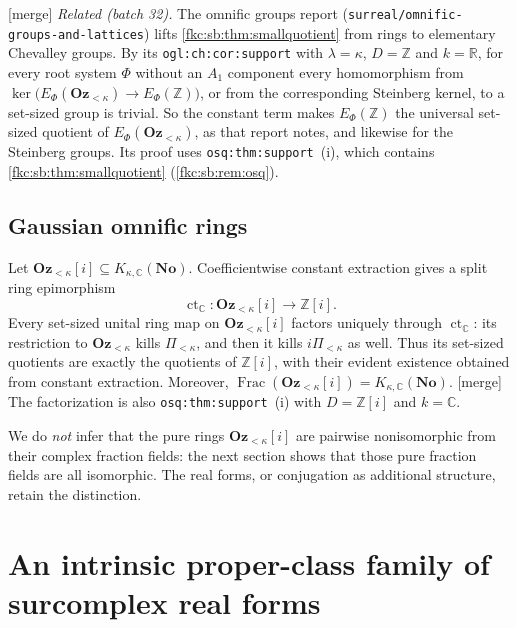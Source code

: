 \documentclass[11pt,letterpaper]{article}
\numberwithin{equation}{section}
\theoremstyle{definition}
\theoremstyle{remark}
\newcommand{\R}{\mathbb R}
\newcommand{\C}{\mathbb C}
\newcommand{\No}{\mathbf{No}}
\newcommand{\mergetag}{\textup{\textsf{\small[merge]}}}%
\newcommand{\Z}{\mathbb Z}
\newcommand{\Oz}{\mathbf{Oz}}
\newcommand{\Frac}{\operatorname{Frac}}
\newcommand{\ct}{\operatorname{ct}}
\newcommand{\KN}[2]{K_{#1,#2}(\No)}%
\newcommand{\Ok}{\Oz_{<\kappa}}
\newcommand{\Pk}{\Pi_{<\kappa}}
\newcommand{\lbl}[1]{\nolinkurl{#1}}%
\begin{document}
\mergetag{} \emph{Related (batch 32).} The omnific groups report (\nolinkurl{surreal/omnific-groups-and-lattices}) lifts \cref{fkc:sb:thm:smallquotient} from rings to elementary Chevalley groups. By its \lbl{ogl:ch:cor:support} with $\lambda=\kappa$, $D=\Z$ and $k=\R$, for every root system $\Phi$ without an $A_1$ component every homomorphism from $\ker\bigl(E_\Phi(\Ok)\to E_\Phi(\Z)\bigr)$, or from the corresponding Steinberg kernel, to a set-sized group is trivial. So the constant term makes $E_\Phi(\Z)$ the universal set-sized quotient of $E_\Phi(\Ok)$, as that report notes, and likewise for the Steinberg groups. Its proof uses \lbl{osq:thm:support}~(i), which contains \cref{fkc:sb:thm:smallquotient} (\cref{fkc:sb:rem:osq}).

\subsection{Gaussian omnific rings}\label{fkc:sb:sub:gaussian}
Let $\Ok[i]\subseteq\KN\kappa\C$. Coefficientwise constant extraction gives a split ring epimorphism
\[
 \ct_\C:\Ok[i]\longrightarrow\Z[i].
\]
Every set-sized unital ring map on $\Ok[i]$ factors uniquely through $\ct_\C$: its restriction to $\Ok$ kills $\Pk$, and then it kills $i\Pk$ as well. Thus its set-sized quotients are exactly the quotients of $\Z[i]$, with their evident existence obtained from constant extraction. Moreover, $\Frac(\Ok[i])=\KN\kappa\C$. \mergetag{} The factorization is also \lbl{osq:thm:support}~(i) with $D=\Z[i]$ and $k=\C$.

We do \emph{not} infer that the pure rings $\Ok[i]$ are pairwise nonisomorphic from their complex fraction fields: the next section shows that those pure fraction fields are all isomorphic. The real forms, or conjugation as additional structure, retain the distinction.

\section{An intrinsic proper-class family of surcomplex real forms}\label{fkc:sb:sec:realforms}
\end{document}
